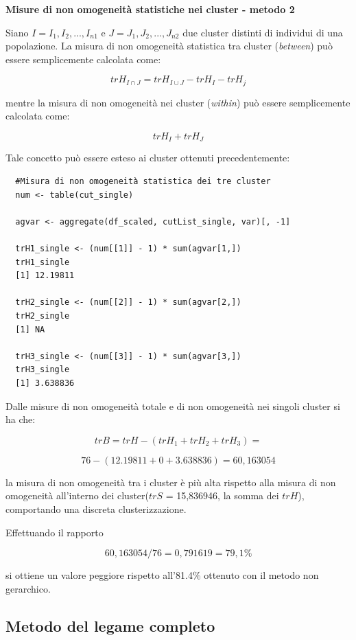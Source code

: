 \noindent \textbf{Misure di non omogeneità statistiche nei cluster - metodo 2}

Siano $I = I_1, I_2, ..., I_{n1}$ e $J = J_1, J_2, ..., J_{n2}$ due cluster distinti di individui di una popolazione. La misura di non omogeneità statistica tra cluster (\textit{between}) può essere semplicemente calcolata come:

\[trH_{I\cap J} = trH_{I\cup J} - trH_I - trH_j\]

mentre la misura di non omogeneità nei cluster (\textit{within}) può essere semplicemente calcolata come:

\[trH_I + trH_J\]

Tale concetto può essere esteso ai cluster ottenuti precedentemente:

\vspace{5mm}
\begin{lstlisting}
  #Misura di non omogeneità statistica dei tre cluster
  num <- table(cut_single)

  agvar <- aggregate(df_scaled, cutList_single, var)[, -1]

  trH1_single <- (num[[1]] - 1) * sum(agvar[1,])
  trH1_single
  [1] 12.19811

  trH2_single <- (num[[2]] - 1) * sum(agvar[2,])
  trH2_single  
  [1] NA

  trH3_single <- (num[[3]] - 1) * sum(agvar[3,])
  trH3_single
  [1] 3.638836
\end{lstlisting}
\vspace{5mm}

Dalle misure di non omogeneità totale e di non omogeneità nei singoli cluster si ha che:

\[trB = trH - (trH_1 + trH_2 + trH_3) = \]

\[76 - (12.19811 + 0 + 3.638836) = 60,163054\]

\noindent la misura di non omogeneità tra i cluster è più alta rispetto alla misura di non omogeneità all'interno dei cluster($trS$ = 15,836946, la somma dei $trH$), comportando una discreta clusterizzazione.

Effettuando il rapporto

\[60,163054 / 76 = 0,791619 = 79,1\%\]

si ottiene un valore peggiore rispetto all'81.4\% ottenuto con il metodo non gerarchico.

\subsection{Metodo del legame completo}\label{cap5.2.2}

